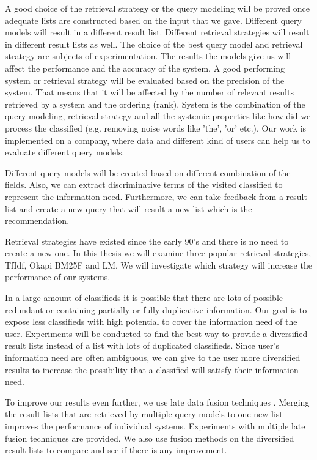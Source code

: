 A good choice of the retrieval strategy or the query modeling will be proved once adequate lists are constructed based on the input that we gave. Different query models will result in a different result list. Different retrieval strategies will result in different result lists as well. The choice of the best query model and retrieval strategy are subjects of experimentation. The results the models give us will affect the performance and the accuracy of the system. A good performing system or retrieval strategy will be evaluated based on the precision of the system. That means that it will be affected by the number of relevant results retrieved by a system and the ordering (rank). System is the combination of the query modeling, retrieval strategy and all the systemic properties like how did we process the classified (e.g. removing noise words like 'the', 'or' etc.). Our work is implemented on a company, where data and different kind of users can help us to evaluate different query models.

Different query models will be created based on different combination of the fields. Also, we can extract discriminative terms of the visited classified to represent the information need. Furthermore, we can take feedback from a result list and create a new query that will result a new list which is the recommendation.

Retrieval strategies have existed since the early 90's and there is no need to create a new one. In this thesis we will examine three popular retrieval strategies, TfIdf, Okapi BM25F and LM. We will investigate which strategy will increase the performance of our systems.

In a large amount of classifieds it is possible that there are lots of possible redundant or containing partially or fully duplicative information. Our goal is to expose less classifieds with high potential to cover the information need of the user. Experiments will be conducted to find the best way to provide a diversified result lists instead of a list with lots of duplicated classifieds. Since user's information need are often ambiguous, we can give to the user more diversified results to increase the possibility that a classified will satisfy their information need.

To improve our results even further, we use late data fusion techniques \cite{Belkin}. Merging the result lists that are retrieved by multiple query models to one new list improves the performance of individual systems. Experiments with multiple late fusion techniques are provided. We also use fusion methods on the diversified result lists to compare and see if there is any improvement.

